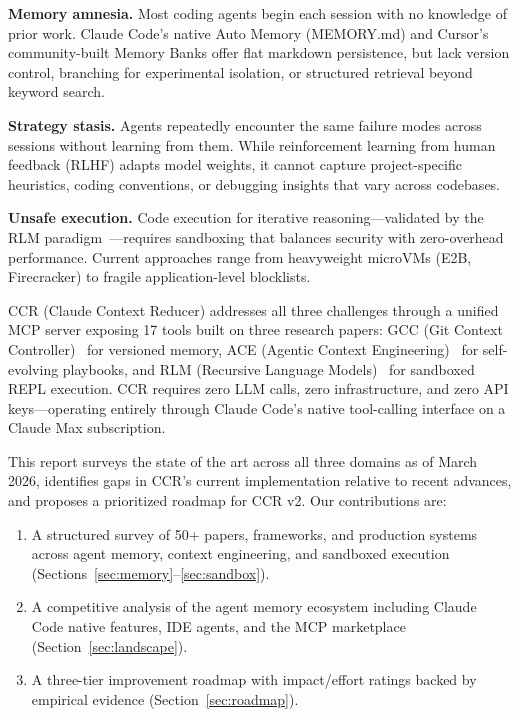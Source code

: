\documentclass[11pt]{article}
\begin{document}
\textbf{Memory amnesia.} Most coding agents begin each session with no knowledge of prior work. Claude Code's native Auto Memory (MEMORY.md) and Cursor's community-built Memory Banks offer flat markdown persistence, but lack version control, branching for experimental isolation, or structured retrieval beyond keyword search.

\textbf{Strategy stasis.} Agents repeatedly encounter the same failure modes across sessions without learning from them. While reinforcement learning from human feedback (RLHF) adapts model weights, it cannot capture project-specific heuristics, coding conventions, or debugging insights that vary across codebases.

\textbf{Unsafe execution.} Code execution for iterative reasoning---validated by the RLM paradigm~\cite{rlm}---requires sandboxing that balances security with zero-overhead performance. Current approaches range from heavyweight microVMs (E2B, Firecracker) to fragile application-level blocklists.

CCR (Claude Context Reducer) addresses all three challenges through a unified MCP server exposing 17 tools built on three research papers: GCC (Git Context Controller)~\cite{gcc} for versioned memory, ACE (Agentic Context Engineering)~\cite{ace} for self-evolving playbooks, and RLM (Recursive Language Models)~\cite{rlm} for sandboxed REPL execution. CCR requires zero LLM calls, zero infrastructure, and zero API keys---operating entirely through Claude Code's native tool-calling interface on a Claude Max subscription.

This report surveys the state of the art across all three domains as of March 2026, identifies gaps in CCR's current implementation relative to recent advances, and proposes a prioritized roadmap for CCR v2. Our contributions are:

\begin{enumerate}[leftmargin=*]
    \item A structured survey of 50+ papers, frameworks, and production systems across agent memory, context engineering, and sandboxed execution (Sections~\ref{sec:memory}--\ref{sec:sandbox}).
    \item A competitive analysis of the agent memory ecosystem including Claude Code native features, IDE agents, and the MCP marketplace (Section~\ref{sec:landscape}).
    \item A three-tier improvement roadmap with impact/effort ratings backed by empirical evidence (Section~\ref{sec:roadmap}).
\end{enumerate}
\end{document}
